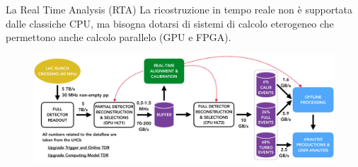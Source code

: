 \documentclass[
10pt,
aspectratio=169,
]{beamer}
\begin{document}
\begin{frame}{La Real Time Analysis (RTA)}
La ricostruzione in tempo reale non è supportata dalle classiche CPU, ma bisogna dotarsi di sistemi di calcolo eterogeneo che permettono anche calcolo parallelo (GPU e FPGA).
\begin{figure}
    \centering
    \includegraphics[width=\textwidth]{hidef_RTA_dataflow_widescreen.png}
\end{figure}
    
\end{frame}
\end{document}
